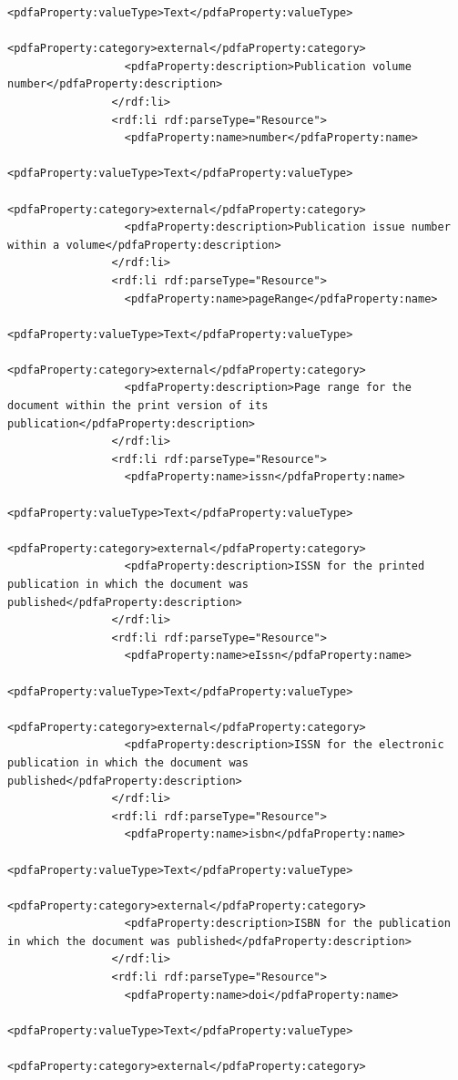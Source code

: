 \begin{lstlisting}[style=myXML,
caption={Second part of the XML metadata embedded in a PDF file (some reformatting has been done to fit the text in the boarders)}, label={lst:pdfinfoOutputPart2}]
                  <pdfaProperty:valueType>Text</pdfaProperty:valueType>
                  <pdfaProperty:category>external</pdfaProperty:category>
                  <pdfaProperty:description>Publication volume number</pdfaProperty:description>
                </rdf:li>
                <rdf:li rdf:parseType="Resource">
                  <pdfaProperty:name>number</pdfaProperty:name>
                  <pdfaProperty:valueType>Text</pdfaProperty:valueType>
                  <pdfaProperty:category>external</pdfaProperty:category>
                  <pdfaProperty:description>Publication issue number within a volume</pdfaProperty:description>
                </rdf:li>
                <rdf:li rdf:parseType="Resource">
                  <pdfaProperty:name>pageRange</pdfaProperty:name>
                  <pdfaProperty:valueType>Text</pdfaProperty:valueType>
                  <pdfaProperty:category>external</pdfaProperty:category>
                  <pdfaProperty:description>Page range for the document within the print version of its publication</pdfaProperty:description>
                </rdf:li>
                <rdf:li rdf:parseType="Resource">
                  <pdfaProperty:name>issn</pdfaProperty:name>
                  <pdfaProperty:valueType>Text</pdfaProperty:valueType>
                  <pdfaProperty:category>external</pdfaProperty:category>
                  <pdfaProperty:description>ISSN for the printed publication in which the document was published</pdfaProperty:description>
                </rdf:li>
                <rdf:li rdf:parseType="Resource">
                  <pdfaProperty:name>eIssn</pdfaProperty:name>
                  <pdfaProperty:valueType>Text</pdfaProperty:valueType>
                  <pdfaProperty:category>external</pdfaProperty:category>
                  <pdfaProperty:description>ISSN for the electronic publication in which the document was published</pdfaProperty:description>
                </rdf:li>
                <rdf:li rdf:parseType="Resource">
                  <pdfaProperty:name>isbn</pdfaProperty:name>
                  <pdfaProperty:valueType>Text</pdfaProperty:valueType>
                  <pdfaProperty:category>external</pdfaProperty:category>
                  <pdfaProperty:description>ISBN for the publication in which the document was published</pdfaProperty:description>
                </rdf:li>
                <rdf:li rdf:parseType="Resource">
                  <pdfaProperty:name>doi</pdfaProperty:name>
                  <pdfaProperty:valueType>Text</pdfaProperty:valueType>
                  <pdfaProperty:category>external</pdfaProperty:category>

\end{lstlisting}
